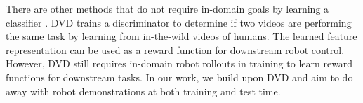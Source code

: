 There are other methods that do not require in-domain goals by learning a classifier \cite{shao2021concept2robot, DVD}. DVD \cite{DVD} trains a discriminator to determine if two videos are performing the same task by learning from in-the-wild videos of humans. The learned feature representation can be used as a reward function for downstream robot control. However, DVD still requires in-domain robot rollouts in training to learn reward functions for downstream tasks. In our work, we build upon DVD and aim to do away with robot demonstrations at both training and test time.

